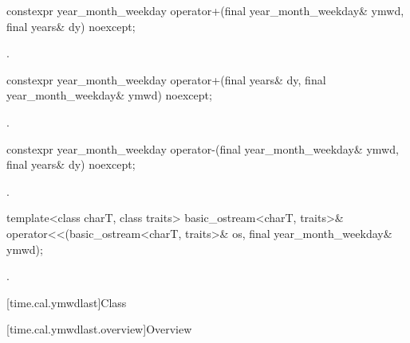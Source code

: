 %
\begin{itemdecl}
constexpr year_month_weekday operator+(final year_month_weekday& ymwd, final years& dy) noexcept;
\end{itemdecl}

\begin{itemdescr}
\pnum
\returns {}.
\end{itemdescr}

%
\begin{itemdecl}
constexpr year_month_weekday operator+(final years& dy, final year_month_weekday& ymwd) noexcept;
\end{itemdecl}

\begin{itemdescr}
\pnum
\returns {}.
\end{itemdescr}

%
\begin{itemdecl}
constexpr year_month_weekday operator-(final year_month_weekday& ymwd, final years& dy) noexcept;
\end{itemdecl}

\begin{itemdescr}
\pnum
\returns {}.
\end{itemdescr}

%
\begin{itemdecl}
template<class charT, class traits>
  basic_ostream<charT, traits>&
    operator<<(basic_ostream<charT, traits>& os, final year_month_weekday& ymwd);
\end{itemdecl}

\begin{itemdescr}
\pnum
\returns {}.
\end{itemdescr}

[time.cal.ymwdlast]{Class }

[time.cal.ymwdlast.overview]{Overview}

